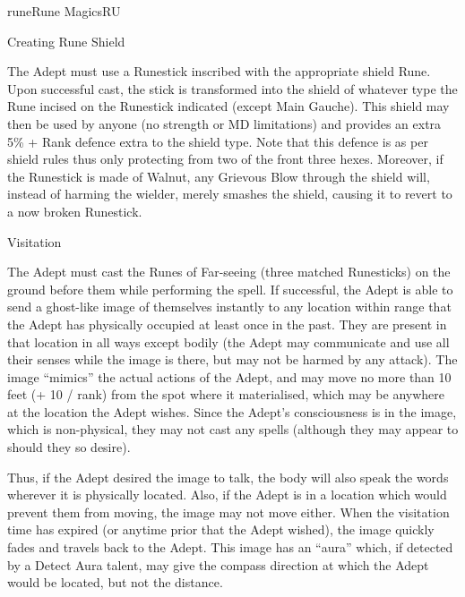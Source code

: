 \begin{college}[1.1]{rune}{Rune Magics}{RU}
\begin{spell}[S-3]{Creating Rune Shield}
\begin{effects}
The Adept must use a Runestick inscribed with the appropriate shield
Rune.  Upon successful cast, the stick is transformed into the shield
of whatever type the Rune incised on the Runestick indicated (except
Main Gauche).  This shield may then be used by anyone (no strength or
MD limitations) and provides an extra 5\% + Rank defence extra to the
shield type.  Note that this defence is as per shield rules thus only
protecting from two of the front three hexes.  Moreover, if the
Runestick is made of Walnut, any Grievous Blow through the shield
will, instead of harming the wielder, merely smashes the shield,
causing it to revert to a now broken Runestick.
\end{effects}
\end{spell}

\begin{spell}[S-4]{Visitation}

\begin{effects}
The Adept must cast the Runes of Far-seeing (three matched Runesticks)
on the ground before them while performing the spell.  If successful,
the Adept is able to send a ghost-like image of themselves instantly
to any location within range that the Adept has physically occupied at
least once in the past.  They are present in that location in all ways
except bodily (\ie the Adept may communicate and use all their
senses while the image is there, but may not be harmed by any
attack). The image ``mimics'' the actual actions of the Adept, and may
move no more than 10 feet (+ 10 / rank) from the spot where it
materialised, which may be anywhere at the location the Adept
wishes. Since the Adept's consciousness is in the image, which is
non-physical, they may not cast any spells (although they may appear
to should they so desire).

Thus, if the Adept desired the image to talk, the body will also speak
the words wherever it is physically located.  Also, if the Adept is in
a location which would prevent them from moving, the image may not
move either.  When the visitation time has expired (or anytime prior
that the Adept wished), the image quickly fades and travels back to
the Adept.  This image has an ``aura'' which, if detected by a Detect
Aura talent, may give the compass direction at which the Adept would
be located, but not the distance.
\end{effects}
\end{spell}


\end{college}
